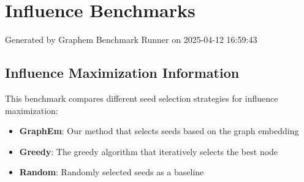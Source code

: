 \documentclass{article}
\begin{document}
\section*{Influence Benchmarks}
Generated by Graphem Benchmark Runner on 2025-04-12 16:59:43
\subsection*{Influence Maximization Information}
This benchmark compares different seed selection strategies for influence maximization:
\begin{itemize}
\item \textbf{GraphEm}: Our method that selects seeds based on the graph embedding
\item \textbf{Greedy}: The greedy algorithm that iteratively selects the best node
\item \textbf{Random}: Randomly selected seeds as a baseline
\end{itemize}
\end{document}
